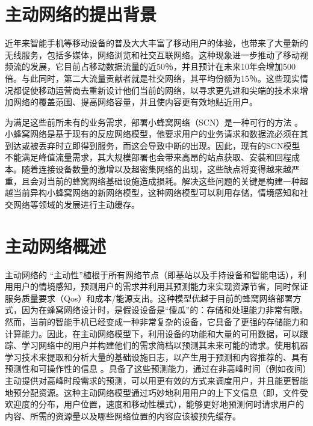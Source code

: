 \documentclass[bachelor]{seuthesis} %
\begin{document}
\begin{Main}
\section{主动网络的提出背景}
近年来智能手机等移动设备的普及大大丰富了移动用户的体验，也带来了大量新的无线服务，包括多媒体，网络浏览和社交互联网络。这种现象进一步推动了移动视频流的发展，它目前占移动数据流量的近50％，并且预计在未来10年会增加500倍\cite{cisco2014global}。与此同时，第二大流量贡献者就是社交网络，其平均份额为15％\cite{Ericsson20125g}。这些现实情况都促使移动运营商去重新设计他们当前的网络，以寻求更先进和尖端的技术来增加网络的覆盖范围、提高网络容量，并且使内容更有效地贴近用户。\par
为满足这些前所未有的业务需求，部署小蜂窝网络（SCN）是一种可行的方法 \cite{andrews2013seven}。小蜂窝网络是基于现有的反应网络模型，他要求用户的业务请求和数据流必须在其到达或被丢弃时立即得到服务，而这会导致中断的出现。因此，现有的SCN模型不能满足峰值流量需求，其大规模部署也会带来高昂的站点获取、安装和回程成本。随着连接设备数量的激增以及超密集网络的出现，这些缺点将变得越来越严重，且会对当前的蜂窝网络基础设施造成损耗。解决这些问题的关键是构建一种超越当前异构小蜂窝网络的新网络模型，这种网络模型可以利用存储，情境感知和社交网络等领域的发展进行主动缓存。
\section{主动网络概述}
主动网络的 “主动性”植根于所有网络节点（即基站以及手持设备和智能电话），利用用户的情境感知，预测用户的需求并利用其预测能力来实现资源节省，同时保证服务质量要求（Qos）和成本/能源支出\cite{bastug2013proactive}。这种模型优越于目前的蜂窝网络部署方式，因为在蜂窝网络设计时，是假设设备是“傻瓜”的：存储和处理能力非常有限。然而，当前的智能手机已经变成一种非常复杂的设备，它具备了更强的存储能力和计算能力。因此，在主动网络模型下，利用设备的功能和大量的可用数据，可以跟踪、学习网络中的用户并构建他们的需求简档以预测其未来可能的请求。使用机器学习技术来提取和分析大量的基础设施日志，以产生用于预测和内容推荐的、具有预测性和可操作性的信息
\cite{etter2012been}。具备了这些预测能力，通过在非高峰时间（例如夜间）主动提供对高峰时段需求的预测，可以用更有效的方式来调度用户，并且能更智能地预分配资源。这种主动网络模型通过巧妙地利用用户的上下文信息（即，文件受欢迎度的分布，用户位置，速度和移动性模式），能够更好地预测何时请求用户的内容、所需的资源量以及哪些网络位置的内容应该被预先缓存。

\end{Main}
\end{document}
